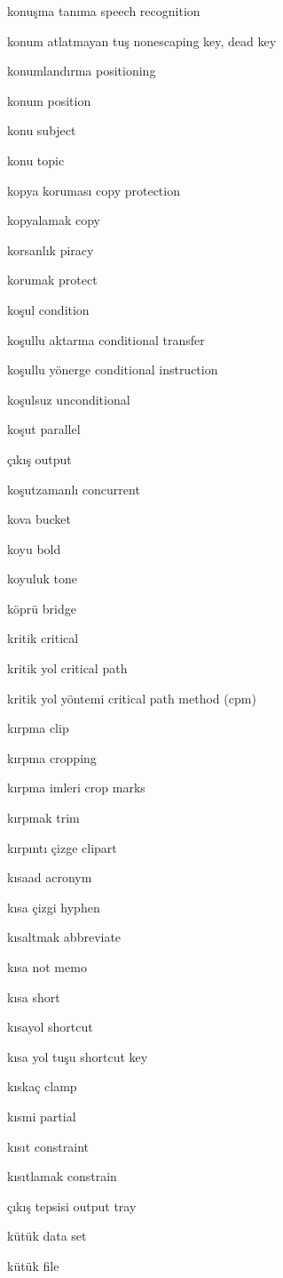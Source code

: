 \documentclass[12pt,fleqn]{article}\usepackage{../../common}
\begin{document}
konuşma tanıma speech recognition

konum atlatmayan tuş nonescaping key, dead key

konumlandırma positioning

konum position

konu subject

konu topic

kopya koruması copy protection

kopyalamak copy

korsanlık piracy

korumak protect

koşul condition

koşullu aktarma conditional transfer

koşullu yönerge conditional instruction

koşulsuz unconditional

koşut parallel

çıkış output

koşutzamanlı concurrent

kova bucket

koyu bold

koyuluk tone

köprü bridge

kritik critical

kritik yol critical path

kritik yol yöntemi critical path method (cpm)

kırpma clip

kırpma cropping

kırpma imleri crop marks

kırpmak trim

kırpıntı çizge clipart

kısaad acronym

kısa çizgi hyphen

kısaltmak abbreviate

kısa not memo

kısa short

kısayol shortcut

kısa yol tuşu shortcut key

kıskaç clamp

kısmi partial

kısıt constraint

kısıtlamak constrain

çıkış tepsisi output tray

kütük data set

kütük file
\end{document}
